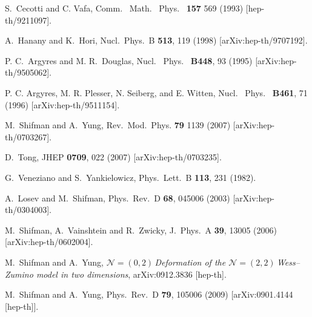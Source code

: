 \documentclass[epsfig,12pt]{article}
\newcommand{\ntwo}{${\mathcal N}=2\,$}
\newcommand{\ntt}{${\mathcal N}=(2,2)\,$}
\newcommand{\nzt}{${\mathcal N}=(0,2)\,$}
\begin{document}
{\begin{thebibliography}{99}
S.~Cecotti and C. Vafa,
Comm. \ Math. \ Phys. \ {\bf 157} 569 (1993)
[hep-th/9211097].

A.~Hanany and K.~Hori,
  Nucl.\ Phys.\  B {\bf 513}, 119 (1998)
  [arXiv:hep-th/9707192].

P. C.~Argyres and M. R.~Douglas,
Nucl. \ Phys. \ {\bf B448}, 93 (1995)   
[arXiv:hep-th/9505062].
  
P. C. Argyres, M. R. Plesser, N. Seiberg, and E. Witten,
Nucl. \ Phys.  \ {\bf B461}, 71 (1996) 
[arXiv:hep-th/9511154].

M.~Shifman and A.~Yung,
Rev.\ Mod.\ Phys. {\bf 79} 1139 (2007)
[arXiv:hep-th/0703267].

  D.~Tong,
  JHEP {\bf 0709}, 022 (2007)
  [arXiv:hep-th/0703235].
  
 G.~Veneziano and S.~Yankielowicz,
  Phys.\ Lett.\  B {\bf 113}, 231 (1982).
  
A.~Losev and M.~Shifman,
  Phys.\ Rev.\  D {\bf 68}, 045006 (2003)
  [arXiv:hep-th/0304003].
  
  M.~Shifman, A.~Vainshtein and R.~Zwicky,
  J.\ Phys.\ A  {\bf 39}, 13005 (2006)
  [arXiv:hep-th/0602004].
  
  M.~Shifman and A.~Yung,
  {\em \nzt Deformation of the \ntt Wess--Zumino model in two dimensions},
  arXiv:0912.3836 [hep-th].
  
  M.~Shifman and A.~Yung,
  Phys.\ Rev.\  D {\bf 79}, 105006 (2009)
  [arXiv:0901.4144 [hep-th]].


\end{thebibliography}}
\end{document}
